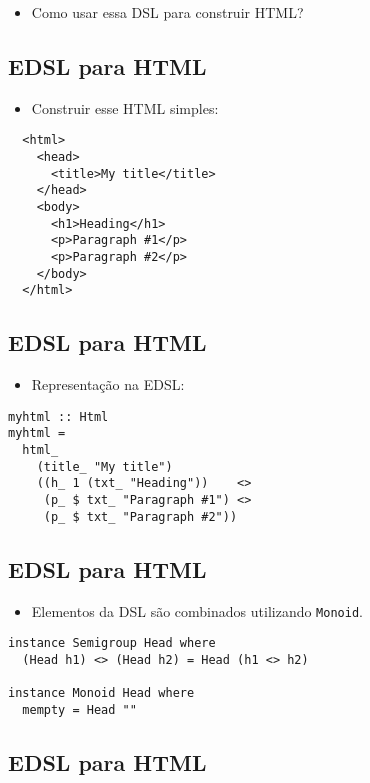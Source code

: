 \documentclass[11pt]{article}
\begin{document}
\begin{itemize}
\item Como usar essa DSL para construir HTML?
\end{itemize}
\subsection*{EDSL para HTML}
\label{sec:orgc938e2f}

\begin{itemize}
\item Construir esse HTML simples:
\end{itemize}

\begin{verbatim}
  <html>
    <head>
      <title>My title</title>
    </head>
    <body>
      <h1>Heading</h1>
      <p>Paragraph #1</p>
      <p>Paragraph #2</p>
    </body>
  </html>
\end{verbatim}
\subsection*{EDSL para HTML}
\label{sec:org4a62fe5}

\begin{itemize}
\item Representação na EDSL:
\end{itemize}

\begin{verbatim}
myhtml :: Html
myhtml =
  html_
    (title_ "My title")
    ((h_ 1 (txt_ "Heading"))    <>
     (p_ $ txt_ "Paragraph #1") <>
     (p_ $ txt_ "Paragraph #2"))
\end{verbatim}
\subsection*{EDSL para HTML}
\label{sec:org02cfd75}

\begin{itemize}
\item Elementos da DSL são combinados utilizando \texttt{Monoid}.
\end{itemize}

\begin{verbatim}
instance Semigroup Head where
  (Head h1) <> (Head h2) = Head (h1 <> h2)

instance Monoid Head where
  mempty = Head ""
\end{verbatim}
\subsection*{EDSL para HTML}
\label{sec:orgbc24c74}
\end{document}
